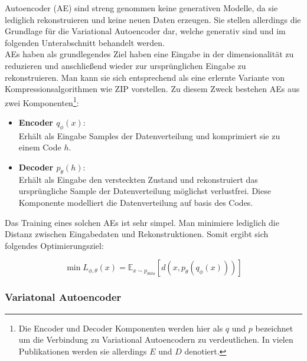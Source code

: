 Autoencoder (AE) sind streng genommen keine generativen Modelle, da sie lediglich rekonstruieren und keine neuen Daten erzeugen. Sie stellen allerdings die Grundlage für die Variational Autoencoder dar, welche generativ sind und im folgenden Unterabschnitt behandelt werden. \\ 
AEs haben als grundlegendes Ziel haben eine Eingabe in der dimensionalität zu reduzieren und anschließend wieder zur ursprünglichen Eingabe zu rekonstruieren. Man kann sie sich entsprechend als eine erlernte Variante von Kompressionsalgorithmen wie ZIP vorstellen. 
Zu diesem Zweck bestehen AEs aus zwei Komponenten\footnote{
    Die Encoder und Decoder Komponenten werden hier als $q$ und $p$ bezeichnet um die Verbindung zu Variational Autoencodern zu verdeutlichen. In vielen Publikationen werden sie allerdings $E$ und $D$ denotiert.    
}:
\begin{itemize}
    \item \textbf{Encoder $q_\phi(x)$}: \\
    Erhält als Eingabe Samples der Datenverteilung und komprimiert sie zu einem Code $h$.
    \item \textbf{Decoder $p_\theta(h)$}: \\
    Erhält als Eingabe den versteckten Zustand und rekonstruiert das ursprüngliche Sample der Datenverteilung möglichst verlustfrei. Diese Komponente modelliert die Datenverteilung auf basis des Codes.
\end{itemize}

Das Training eines solchen AEs ist sehr simpel. Man minimiere lediglich die Distanz zwischen Eingabedaten und Rekonstruktionen. Somit ergibt sich folgendes Optimierungsziel:

\begin{equation}
    \min L_{\phi, \theta}(x) = \mathbb E _{x \sim p_{data}} 
    \left [ 
        d(x, p_\theta(q_\phi(x)))
    \right ]
\end{equation}

\subsubsection{Variatonal Autoencoder}

